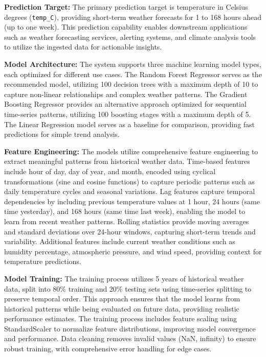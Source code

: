 \documentclass[12pt,a4paper]{article}
\begin{document}
\textbf{Prediction Target:} The primary prediction target is temperature in Celsius degrees (\texttt{temp\_C}), providing short-term weather forecasts for 1 to 168 hours ahead (up to one week). This prediction capability enables downstream applications such as weather forecasting services, alerting systems, and climate analysis tools to utilize the ingested data for actionable insights.

\textbf{Model Architecture:} The system supports three machine learning model types, each optimized for different use cases. The Random Forest Regressor serves as the recommended model, utilizing 100 decision trees with a maximum depth of 10 to capture non-linear relationships and complex weather patterns. The Gradient Boosting Regressor provides an alternative approach optimized for sequential time-series patterns, utilizing 100 boosting stages with a maximum depth of 5. The Linear Regression model serves as a baseline for comparison, providing fast predictions for simple trend analysis.

\textbf{Feature Engineering:} The models utilize comprehensive feature engineering to extract meaningful patterns from historical weather data. Time-based features include hour of day, day of year, and month, encoded using cyclical transformations (sine and cosine functions) to capture periodic patterns such as daily temperature cycles and seasonal variations. Lag features capture temporal dependencies by including previous temperature values at 1 hour, 24 hours (same time yesterday), and 168 hours (same time last week), enabling the model to learn from recent weather patterns. Rolling statistics provide moving averages and standard deviations over 24-hour windows, capturing short-term trends and variability. Additional features include current weather conditions such as humidity percentage, atmospheric pressure, and wind speed, providing context for temperature predictions.

\textbf{Model Training:} The training process utilizes 5 years of historical weather data, split into 80\% training and 20\% testing sets using time-series splitting to preserve temporal order. This approach ensures that the model learns from historical patterns while being evaluated on future data, providing realistic performance estimates. The training process includes feature scaling using StandardScaler to normalize feature distributions, improving model convergence and performance. Data cleaning removes invalid values (NaN, infinity) to ensure robust training, with comprehensive error handling for edge cases.
\end{document}
